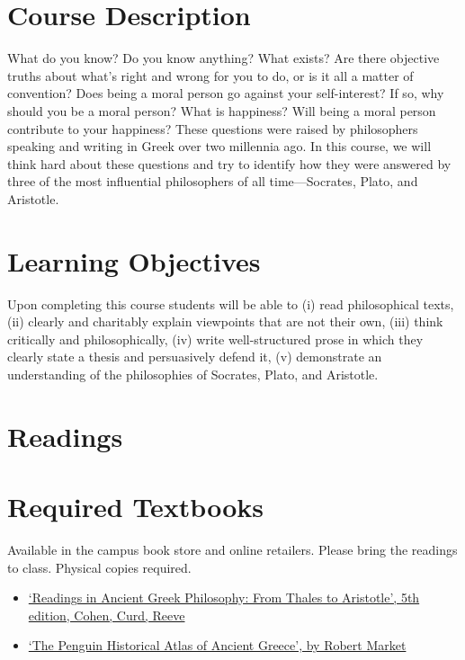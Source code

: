 \documentclass[article,oneside]{memoir}
\begin{document}
\section{Course Description}

What do you know? Do you know anything? What exists? Are there objective truths about what’s right and wrong for you to do, or is it all a matter of convention? Does being a moral person go against your self-interest? If so, why should you be a moral person? What is happiness? Will being a moral person contribute to your happiness? These questions were raised by philosophers speaking and writing in Greek over two millennia ago. In this course, we will think hard about these questions and try to identify how they were answered by three of the most influential philosophers of all time---Socrates, Plato, and Aristotle. 

\section{Learning Objectives}

Upon completing this course students will be able to (i) read philosophical texts, (ii) clearly and charitably explain viewpoints that
are not their own, (iii) think critically and philosophically, (iv) write well-structured prose in which they clearly state a thesis and persuasively defend it, (v) demonstrate an understanding of the philosophies of Socrates, Plato, and Aristotle.


\section{Readings}
\section{Required Textbooks}

Available in the campus book store and online retailers. Please bring the readings to class. Physical copies required.
\begin{itemize}
\item \href{https://www.amazon.com/Readings-Ancient-Greek-Philosophy-Aristotle/dp/1624665322/ref=dp_ob_title_bk}{`Readings in Ancient Greek Philosophy: From Thales to Aristotle', 5th edition, Cohen, Curd, Reeve}

\item \href{https://www.amazon.com/dp/0140513353/ref=cm_sw_em_r_mt_dp_U_kuAiEb647QCEW}{`The Penguin Historical Atlas of Ancient Greece', by Robert Market} 

\end{itemize}
\end{document}
